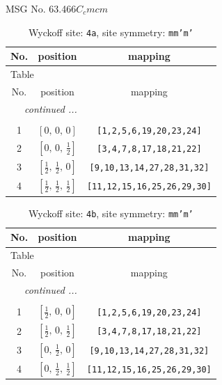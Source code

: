 \documentclass[fleqn,8pt]{jsarticle}
\begin{document}
\setcounter{MaxMatrixCols}{32}

\renewcommand{\tablename}{Table~}
\renewcommand{\figurename}{Figure~}
\begin{center}
\LARGE
MSG No. 63.466\quad$C_{c}mcm$
\end{center}
\renewcommand{\arraystretch}{1.2}
\begin{longtable}{ccc}
\caption{Wyckoff site: {\tt 4a}, site symmetry: {\tt mm'm'}}
 \\
 \hline \hline
No. & position & mapping \\ \hline \endfirsthead

\multicolumn{2}{l}{\tablename\ \thetable{}} \\
 \hline \hline
No. & position & mapping \\ \hline \endhead

 \hline \hline
\multicolumn{2}{r}{\footnotesize\it continued ...} \\ \endfoot

 \hline \hline
\multicolumn{2}{r}{} \\ \endlastfoot

1 & $\left[ 0,\, 0,\, 0 \right]$ & {\tt [1,2,5,6,19,20,23,24]} \\ \hline
2 & $\left[ 0,\, 0,\, \frac{1}{2} \right]$ & {\tt [3,4,7,8,17,18,21,22]} \\ \hline
3 & $\left[ \frac{1}{2},\, \frac{1}{2},\, 0 \right]$ & {\tt [9,10,13,14,27,28,31,32]} \\ \hline
4 & $\left[ \frac{1}{2},\, \frac{1}{2},\, \frac{1}{2} \right]$ & {\tt [11,12,15,16,25,26,29,30]} \\
\end{longtable}
\renewcommand{\arraystretch}{1.2}
\begin{longtable}{ccc}
\caption{Wyckoff site: {\tt 4b}, site symmetry: {\tt mm'm'}}
 \\
 \hline \hline
No. & position & mapping \\ \hline \endfirsthead

\multicolumn{2}{l}{\tablename\ \thetable{}} \\
 \hline \hline
No. & position & mapping \\ \hline \endhead

 \hline \hline
\multicolumn{2}{r}{\footnotesize\it continued ...} \\ \endfoot

 \hline \hline
\multicolumn{2}{r}{} \\ \endlastfoot

1 & $\left[ \frac{1}{2},\, 0,\, 0 \right]$ & {\tt [1,2,5,6,19,20,23,24]} \\ \hline
2 & $\left[ \frac{1}{2},\, 0,\, \frac{1}{2} \right]$ & {\tt [3,4,7,8,17,18,21,22]} \\ \hline
3 & $\left[ 0,\, \frac{1}{2},\, 0 \right]$ & {\tt [9,10,13,14,27,28,31,32]} \\ \hline
4 & $\left[ 0,\, \frac{1}{2},\, \frac{1}{2} \right]$ & {\tt [11,12,15,16,25,26,29,30]} \\
\end{longtable}
\end{document}
